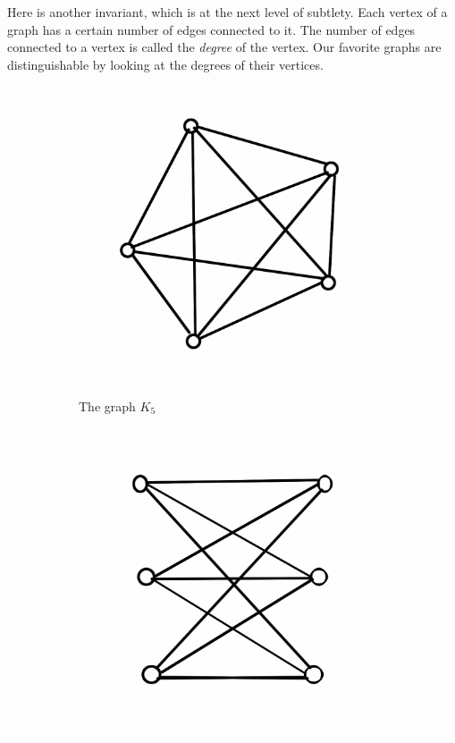 \documentclass[12pt,letterpaper]{article}
\theoremstyle{definition}
\begin{document}
Here is another invariant, which is at the next level of subtlety. Each vertex of a graph has a certain number of 
edges connected to it. The number of edges connected to a vertex is called the \emph{degree} of the vertex.
Our favorite graphs are distinguishable by looking at the degrees of their vertices.
\begin{figure}[h]
\centering
\begin{subfigure}[b]{.4\textwidth}
\includegraphics[width=\textwidth]{images/k5.png}
\caption{The graph $K_5$}
\label{figure:k5}
\end{subfigure}
\begin{subfigure}[b]{.4\textwidth}
\includegraphics[width=\textwidth]{images/k3,3.png}

\end{subfigure}
\end{figure}
\end{document}
